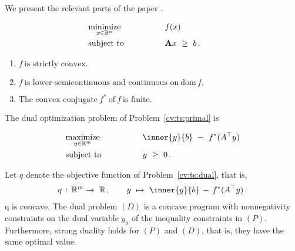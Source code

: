 We present the relevant parts of the paper \cite{Bertsekas2003}.
\begin{fproblem}
  \label{cv:ts:primal}
\begin{align*}
    &\underset{x \in \R^n}
    {\text{minimize}}
    &&\qquad\qquad
    f(x)
    &&&
    \\
    &\text{subject to}
    &&\qquad\qquad
    \mathbf{A}x
    \ 
    \ge
    \ 
    b
    \,.
\end{align*}
\end{fproblem}
\begin{assumptions*}
  \begin{enumerate}[label={(\roman*)}]
    Assume that the map 
    $
      f: \R^n \to \overline{\R}
    $
    has the following properties.
    \item
      $
        f 
        \ 
        \text{is strictly convex.}
      $
    \item
      $
        f
        \ 
        \text{is lower-semicontinuous and continuous on}
        \ 
        \mathrm{dom}\,f
        .
      $
    \item
      $
        \text{The convex conjugate}
        \ 
        f^*
        \ 
        \text{of}\ 
        f
        \ 
        \text{is finite}
        .
      $
  \end{enumerate}
\end{assumptions*}

The dual optimization problem of Problem~\ref{cv:ts:primal} 
is
\begin{fproblem}
  \label{cv:ts:dual}
  \begin{alignat*}{2}
    &\underset{y \in \R^m}
    {\text{maximize}}
    &&\qquad\qquad
    \inner
    {y}
    {b}
    \ 
    -
    \ 
    f^*
    ( A ^ \top y )
    \\
    &\text{subject to}
    &&\qquad\qquad
    y
    \ 
    \ge
    \ 
    0
    \,.
\end{alignat*}
\end{fproblem}
Let $q$ denote the objective function of Problem~\ref{cv:ts:dual},
that is,
\begin{gather}
  q
  \, 
  : 
  \, 
  \R^m  \to\  \R\,,
  \qquad
  y
  \ 
  \mapsto
  \ 
  \inner
    {y}
    {b}
    \, 
    -
    \, 
    f^*
    ( A ^ \top y )
  \,.
\end{gather}
q is concave.
The dual problem $(D)$ is a concave program
with nonnegativity constraints on the dual variable $y_a$
of the inequality constraints in $(P)$.
Furthermore, strong duality holds for $(P)$ and $(D)$,
that is, they have the same optimal value.

